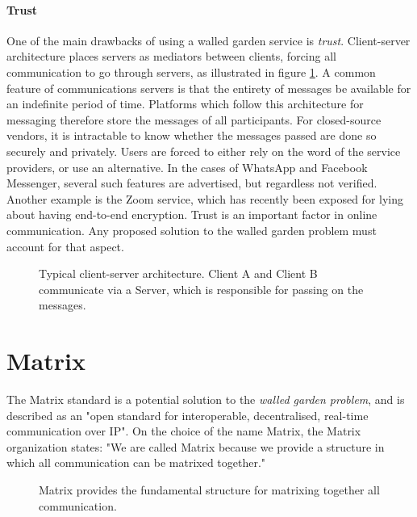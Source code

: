 \paragraph{Trust}
One of the main drawbacks of using a walled garden service is \textit{trust}.
Client-server architecture places servers as mediators between clients, forcing all communication to go through servers, as illustrated in figure \ref{fig:client_server}.
A common feature of communications servers is that the entirety of messages be available for an indefinite period of time.
Platforms which follow this architecture for messaging therefore store the messages of all participants.
For closed-source vendors, it is intractable to know whether the messages passed are done so securely and privately.
Users are forced to either rely on the word of the service providers, or use an alternative.
In the cases of WhatsApp and Facebook Messenger, several such features are advertised, but regardless not verified\cite{twitter_comms_protocol_comparison}.
Another example is the Zoom service, which has recently been exposed for lying about having end-to-end encryption\cite{zoom_e2ee_or_not}.
Trust is an important factor in online communication.
Any proposed solution to the walled garden problem must account for that aspect.

\begin{figure}
    \centering
    \resizebox{0.6\linewidth}{!}{}
    \caption{
        Typical client-server architecture.
        Client A and Client B communicate via a Server, which is responsible for passing on the messages.
    }
    \label{fig:client_server}
\end{figure}

\section{Matrix}
The Matrix standard is a potential solution to the \textit{walled garden problem}, and is described as an "open standard for interoperable, decentralised, real-time communication over IP"\cite{matrix_org}.
On the choice of the name Matrix, the Matrix organization states: "We are called Matrix because we provide a structure in which all communication can be matrixed together."\cite{matrix_org_faq}

\begin{figure}
    \centering
    \caption{Matrix provides the fundamental structure for matrixing together all communication.}
    \label{fig:matrixing_together}
\end{figure}

